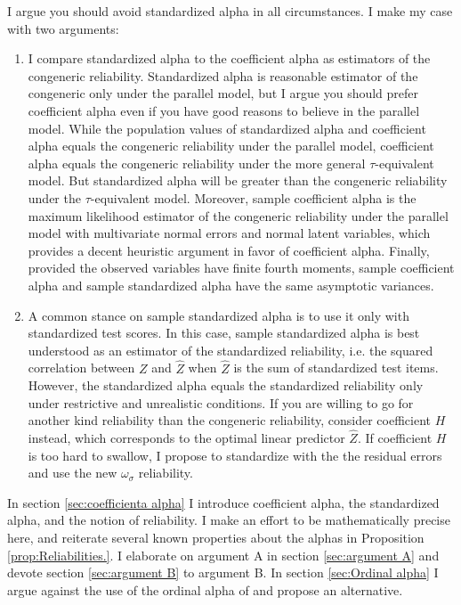 \documentclass[twoside]{article}
\begin{document}
I argue you should avoid standardized alpha in all circumstances. I make my case with two arguments:

\begin{enumerate}[label=(\Alph*)]
\item I compare standardized alpha to the coefficient alpha as estimators of the congeneric reliability. Standardized alpha is reasonable estimator of the congeneric only under the parallel model, but I argue you should prefer coefficient alpha even if you have good reasons to believe in the parallel model. While the population values of standardized alpha and coefficient alpha equals the congeneric reliability under the parallel model, coefficient alpha equals the congeneric reliability under the more general $\tau$-equivalent model. But standardized alpha will be greater than the congeneric reliability under the $\tau$-equivalent model. Moreover, sample coefficient alpha is the maximum likelihood estimator of the congeneric reliability under the parallel model with multivariate normal errors and normal latent variables, which provides a decent heuristic argument in favor of coefficient alpha. Finally, provided the observed variables have finite fourth moments, sample coefficient alpha and sample standardized alpha have the same asymptotic variances. 

\item A common stance on sample standardized alpha is to use it only with standardized test scores. In this case, sample standardized alpha is best understood as an estimator of the standardized reliability, i.e. the squared correlation between $Z$ and $\hat{Z}$ when $\hat{Z}$ is the sum of standardized test items. However, the standardized alpha equals the standardized reliability only under restrictive and unrealistic conditions. If you are willing to go for another kind reliability than the congeneric reliability, consider coefficient $H$ instead, which corresponds to the optimal linear predictor $\hat{Z}$. If coefficient $H$ is too hard to swallow, I propose to standardize with the the residual errors and use the new $\omega_\sigma$ reliability.
\end{enumerate}

In section \ref{sec:coefficienta alpha} I introduce coefficient alpha, the standardized alpha, and the notion of reliability. I make an effort to be mathematically precise here, and reiterate several known properties about the alphas in Proposition \ref{prop:Reliabilities.}. I elaborate on argument A in section \ref{sec:argument A} and devote section \ref{sec:argument B} to argument B. In section \ref{sec:Ordinal alpha} I argue against the use of the ordinal alpha of  \citet{Zumbo2007-ap} and propose an alternative.
\end{document}
